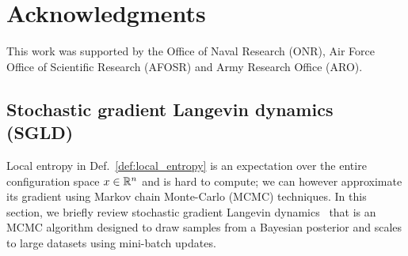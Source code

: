 \documentclass[10pt]{article}
\begin{document}
\section{Acknowledgments}
\label{s:acknowledgements}

This work was supported by the Office of Naval Research (ONR), Air Force Office of Scientific Research (AFOSR) and Army Research Office (ARO).

{
\footnotesize
\linespread{0.8}


}

\begin{appendices}

\renewcommand\thetable{\thesection\arabic{table}}
\renewcommand\thefigure{\thesection\arabic{figure}}

\section{Stochastic gradient Langevin dynamics (SGLD)}
\label{s:app:langevin}

Local entropy in Def.~\eqref{def:local_entropy} is an expectation over the entire configuration space $x \in \mathbb{R}^n$ and is hard to compute; we can however approximate its gradient using Markov chain Monte-Carlo (MCMC) techniques. In this section, we briefly review stochastic gradient Langevin dynamics~\citep{welling2011bayesian} that is an MCMC algorithm designed to draw samples from a Bayesian posterior and scales to large datasets using mini-batch updates.


\end{appendices}
\end{document}
